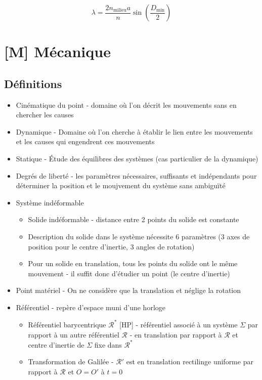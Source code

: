 \documentclass[openany]{book}
\begin{document}
\[ \lambda = \frac{2n_{\text{milieu}}a}{n}\sin (\frac{D_{\text{min}}}{2}) \]

\clearpage
\chapter{[M] Mécanique}

\section{Définitions}
\begin{itemize}
    \item Cinématique du point - domaine où l'on décrit les mouvements sans en chercher les causes
    \item Dynamique - Domaine où l'on cherche à établir le lien entre les mouvements et les causes qui engendrent ces mouvements
    \item Statique - Étude des équilibres des systèmes (cas particulier de la dynamique)
    \item Degrés de liberté - les paramètres nécessaires, suffisants et indépendants pour déterminer la position et le moujvement du système sans ambiguïté
    \item Système indéformable
    \begin{itemize}
        \item Solide indéformable - distance entre 2 points du solide est constante
        \item Description du solide dans le système nécessite 6 paramètres (3 axes de position pour le centre d'inertie, 3 angles de rotation)
        \item Pour un solide en translation, tous les points du solide ont le même mouvement - il suffit donc d'étudier un point (le centre d'inertie)
    \end{itemize}
    \item Point matériel - On ne considère que la translation et néglige la rotation
    \item Référentiel - repère d'espace muni d'une horloge
    \begin{itemize}
        \item Référentiel barycentrique $\mathcal{R}^*$ [HP] - référentiel associé à un système $\Sigma$ par rapport à un autre référentiel $\mathcal{R}$ - en translation par rapport à $\mathcal{R}$ et centre d'inertie de $\Sigma$ fixe dans $\mathcal{R}^*$
        \item Transformation de Galilée - $\mathcal{R'}$ est en translation rectilinge uniforme par rapport à $\mathcal{R}$ et $O=O'$ à $t=0$

\end{itemize}
\end{itemize}
\end{document}
